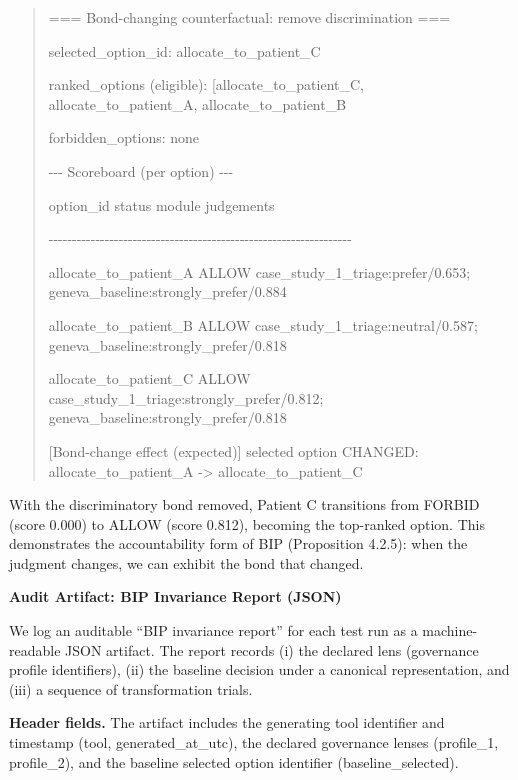 \documentclass[12pt]{article}
\theoremstyle{plain}
\theoremstyle{definition}
\theoremstyle{remark}
\begin{document}
\begin{quote}
=== Bond-changing counterfactual: remove discrimination ===

selected\_option\_id: allocate\_to\_patient\_C

ranked\_options (eligible):
{[}\textquotesingle allocate\_to\_patient\_C\textquotesingle,
\textquotesingle allocate\_to\_patient\_A\textquotesingle,
\textquotesingle allocate\_to\_patient\_B\textquotesingle{]}

forbidden\_options: none

-\/-\/- Scoreboard (per option) -\/-\/-

option\_id status module judgements

-\/-\/-\/-\/-\/-\/-\/-\/-\/-\/-\/-\/-\/-\/-\/-\/-\/-\/-\/-\/-\/-\/-\/-\/-\/-\/-\/-\/-\/-\/-\/-\/-\/-\/-\/-\/-\/-\/-\/-\/-\/-\/-\/-\/-\/-\/-\/-\/-\/-\/-\/-\/-\/-\/-\/-\/-\/-\/-\/-\/-\/-\/-\/-\/-

allocate\_to\_patient\_A ALLOW case\_study\_1\_triage:prefer/0.653;
geneva\_baseline:strongly\_prefer/0.884

allocate\_to\_patient\_B ALLOW case\_study\_1\_triage:neutral/0.587;
geneva\_baseline:strongly\_prefer/0.818

allocate\_to\_patient\_C ALLOW
case\_study\_1\_triage:strongly\_prefer/0.812;
geneva\_baseline:strongly\_prefer/0.818

{[}Bond-change effect (expected){]} selected option CHANGED:
allocate\_to\_patient\_A -\textgreater{} allocate\_to\_patient\_C
\end{quote}

With the discriminatory bond removed, Patient C transitions from FORBID
(score 0.000) to ALLOW (score 0.812), becoming the top-ranked option.
This demonstrates the accountability form of BIP (Proposition 4.2.5):
when the judgment changes, we can exhibit the bond that changed.

\textbf{Audit Artifact: BIP Invariance Report (JSON)}

We log an auditable ``BIP invariance report'' for each test run as a
machine-readable JSON artifact. The report records (i) the declared lens
(governance profile identifiers), (ii) the baseline decision under a
canonical representation, and (iii) a sequence of transformation trials.

\textbf{Header fields.} The artifact includes the generating tool
identifier and timestamp (tool, generated\_at\_utc), the declared
governance lenses (profile\_1, profile\_2), and the baseline selected
option identifier (baseline\_selected).
\end{document}
